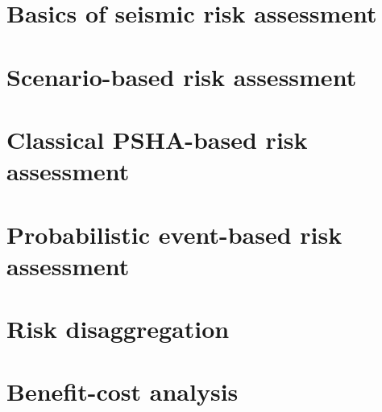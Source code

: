 \section{Basics of seismic risk assessment}
\label{sec:sra-basics}

\section{Scenario-based risk assessment}
\label{sec:scenario-risk}

\section{Classical PSHA-based risk assessment}
\label{sec:classical-psha-risk}

\section{Probabilistic event-based risk assessment}
\label{sec:event-based-risk}

\section{Risk disaggregation}
\label{sec:risk-disaggregation}

\section{Benefit-cost analysis}
\label{sec:benefit-cost-analysis}


